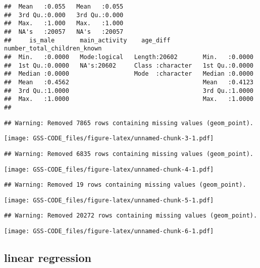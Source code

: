 \documentclass[
]{article}
\begin{document}
\begin{verbatim}
##  Mean   :0.055   Mean   :0.055                                               
##  3rd Qu.:0.000   3rd Qu.:0.000                                               
##  Max.   :1.000   Max.   :1.000                                               
##  NA's   :20057   NA's   :20057                                               
##     is_male       main_activity    age_diff         number_total_children_known
##  Min.   :0.0000   Mode:logical   Length:20602       Min.   :0.0000             
##  1st Qu.:0.0000   NA's:20602     Class :character   1st Qu.:0.0000             
##  Median :0.0000                  Mode  :character   Median :0.0000             
##  Mean   :0.4562                                     Mean   :0.4123             
##  3rd Qu.:1.0000                                     3rd Qu.:1.0000             
##  Max.   :1.0000                                     Max.   :1.0000             
## 
\end{verbatim}

\begin{verbatim}
## Warning: Removed 7865 rows containing missing values (geom_point).
\end{verbatim}

\texttt{[image: GSS-CODE\_files/figure-latex/unnamed-chunk-3-1.pdf]}

\begin{verbatim}
## Warning: Removed 6835 rows containing missing values (geom_point).
\end{verbatim}

\texttt{[image: GSS-CODE\_files/figure-latex/unnamed-chunk-4-1.pdf]}

\begin{verbatim}
## Warning: Removed 19 rows containing missing values (geom_point).
\end{verbatim}

\texttt{[image: GSS-CODE\_files/figure-latex/unnamed-chunk-5-1.pdf]}

\begin{verbatim}
## Warning: Removed 20272 rows containing missing values (geom_point).
\end{verbatim}

\texttt{[image: GSS-CODE\_files/figure-latex/unnamed-chunk-6-1.pdf]}

\hypertarget{linear-regression}{%
\subsection{linear regression}\label{linear-regression}}
\end{document}
